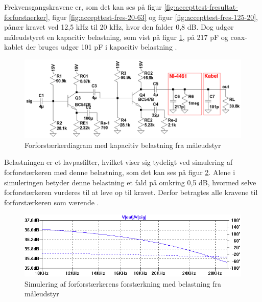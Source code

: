 Frekvensgangskravene er, som det kan ses på figur \ref{fig:accepttest-fresultat-forforstaerker}, figur \ref{fig:accepttest-fres-20-63} og figur \ref{fig:accepttest-fres-125-20}, \checkmark pånær kravet ved 12,5 kHz til 20 kHz, hvor den falder 0,8 dB. Dog udgør måleudstyret en kapacitiv belastning, som vist på figur \ref{fig:cap-error-diagram}, på 217 pF og coax-kablet der bruges udgør 101 pF i kapacitiv belastning \cite{maaling-mm5}.%

\begin{figure}[h]
\centering
\includegraphics[scale=0.35]{teknisk/forforstaerker/cap-error-diagram.png}
\caption{Forforstærkerdiagram med kapacitiv belastning fra måleudstyr}
\label{fig:cap-error-diagram}
\end{figure}

Belastningen er et lavpasfilter, hvilket viser sig tydeligt ved simulering af forforstærkeren med denne belastning, som det kan ses på figur \ref{fig:cap-error}. Alene i simuleringen betyder denne belastning et fald på omkring 0,5 dB, hvormed selve forforstærkeren vurderes til at leve op til kravet. Derfor betragtes alle kravene til forforstærkeren som værende \checkmark.

\begin{figure}[h]
\centering
\includegraphics[width=\textwidth]{teknisk/forforstaerker/cap-error.png}
\caption{Simulering af forforstærkerens forstærkning med belastning fra måleudstyr}
\label{fig:cap-error}
\end{figure}

